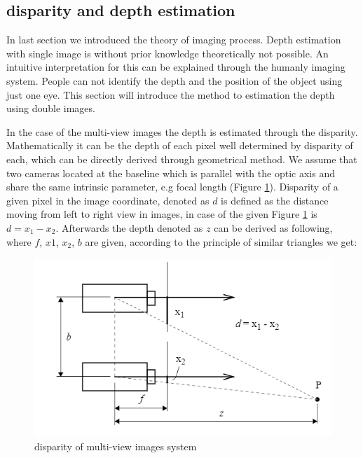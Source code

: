 \subsection{disparity and depth estimation}
\label{disparity and depth estimation}

In last section we introduced the theory of imaging process. Depth estimation with single image is without prior knowledge theoretically not possible. An intuitive interpretation for this can be explained through the humanly imaging system. People can not identify the depth and the position of the object using just one eye. This section will introduce the method to estimation the depth using double images. 

In the case of the multi-view images the depth is estimated through the disparity. Mathematically it can be the depth of each pixel well determined by disparity of each, which can be directly derived through geometrical method. We assume that two cameras located at the baseline which is parallel with the optic axis and share the same intrinsic parameter, e.g focal length (Figure \ref{fig:disparity}). Disparity of a given pixel in the image coordinate, denoted as $d$ is defined as the distance moving from left to right view in images, in case of the given Figure  \ref{fig:disparity} is $d=x_1-x_2$. 
Afterwards the depth denoted as $z$ can be derived as following,
where $f$, $x1$, $x_2$, $b$ are given, according to the principle of similar triangles we get:

\begin{figure}
\centering
\includegraphics[width=15cm]{images/disparity.PNG}
\caption{disparity of multi-view images system}
\label{fig:disparity}
\end{figure}

